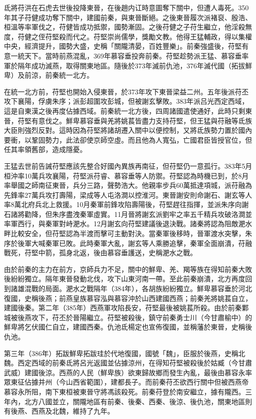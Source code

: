 氐將苻洪在石虎去世後投降東晉，在後趙内讧時意圖奪下關中，但遭人毒死。350年其子苻健成功奪下關中，建國前秦，與東晉斷絕。之後東晉履次派褚裒、殷浩、桓溫等率軍伐之，苻健皆成功抵禦，國勢漸固。之後苻健之子苻生繼立，他淫殺無度，苻健之侄苻堅殺而代之。苻堅崇尚儒學，獎勵文教。他得王猛輔政，得以集權中央，經濟提升，國勢大盛，史稱「關隴清晏，百姓豐樂」。前秦強盛後，苻堅有意一統天下。當時前燕混亂，369年慕容垂投奔前秦。苻堅趁勢派王猛、慕容垂率軍於隔年成功滅燕，取得關東地區。隨後於373年滅前仇池，376年滅代國（拓拔鮮卑）及前涼，前秦統一北方。

在統一北方前，苻堅也開始入侵東晉，於373年攻下東晉梁益二州。五年後派苻丕攻下襄陽，俘虜朱序；派彭超圍攻彭城，但被謝玄擊敗。383年派吕光西定西域，這是自東漢之後再度佔據西域。前秦統一北方後，四周諸國遣使通好，此時只剩東晉，苻堅有意伐之。鮮卑慕容垂與羌將姚萇皆盡力支持苻堅，但王猛與苻融等氐族大臣則強烈反對。這時因為苻堅將諸胡遷入關中以便控制，又將氐族勢力置於國內要衝，以鞏固勢力，此法卻使京師空虛。而且他為人寬弘，亡國君臣皆授官位，但任其率領舊部，造成隱憂。

王猛去世前告誡苻堅應該先整合好國內異族再南征，但苻堅仍一意孤行。383年5月桓沖率10萬兵攻襄陽，苻堅派苻睿、慕容垂等人防禦。苻堅認為時機已到，於8月率舉國之師南征東晉，兵分三路，聲勢浩大。他親率步兵60萬抵達項城，派苻融為先鋒率27萬兵攻打壽陽，梁成等人屯洛澗以控淮河。東晉謝安則命謝石、謝玄等人率8萬北府兵北上救援。10月秦軍前鋒攻陷壽陽後，苻堅趕往指揮，並派朱序向謝石諸將勸降，但朱序盡洩秦軍虛實。11月晉將謝玄派劉牢之率五千精兵攻破洛澗並率軍西行，與秦軍對峙淝水。12月謝玄向苻堅建議後退決戰。諸秦將認為阻敵淝水畔比較安全，但苻堅認為半渡而擊可主動對決。當秦軍後移時，晉軍渡水突擊，朱序於後軍大喊秦軍已敗。此時秦軍大亂，謝玄等人乘勝追擊，秦軍全面崩潰，苻融戰死，苻堅中箭，孤身北返，後由慕容垂護送，史稱淝水之戰。

由於前秦的主力在前方，京師兵力不足，關中的鮮卑、羌、羯等族在得知前秦大敗後紛紛獨立。隔年東晉發動北伐，攻下山東河南一帶。至此前秦崩潰，北方再度回到諸雄混戰的局面。淝水之戰隔年（384年），各胡族紛紛獨立。鮮卑慕容垂於河北復國，史稱後燕；前燕皇族慕容泓與慕容沖於山西建國西燕；前秦羌將姚萇自立，建國後秦。第二年（385年）西燕軍攻陷長安，苻堅最後被姚萇所殺。由於前秦鄴城被後燕攻下，苻丕於晉陽繼立。苻堅被殺後，鎮守前秦勇士川（今甘肅榆中）的鮮卑將乞伏國仁自立，建國西秦。仇池氐楊定也宣佈復國，並稱藩於東晉，史稱後仇池。

第三年（386年）拓跋鮮卑拓跋珪於代地復國，國號「魏」，臣服於後燕，史稱北魏。西定西域的前秦氐將呂光返國並佔據涼州，在得知苻堅被殺後於姑臧（今甘肅武威）建國後涼。西燕的人民（鮮卑族）欲東歸故鄉而發生內亂，最後由慕容永率眾東征佔據并州（今山西省範圍），建都長子。而前秦苻丕欲西行關中但被西燕帝慕容永所阻，南下東桓被東晉守將馮該殺死。前秦苻登於南安繼立，據有隴西。三年內，北方八國並立，關隴地區有前秦、後秦、西秦、後涼、後仇池，關東地區則有後燕、西燕及北魏，維持了九年。

